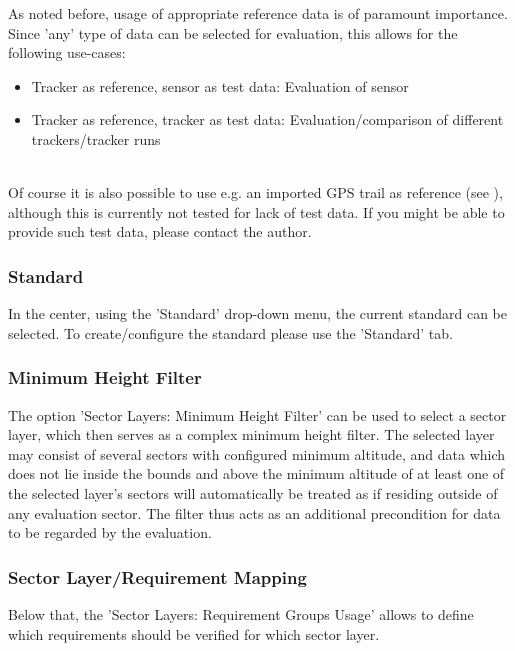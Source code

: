 As noted before, usage of appropriate reference data is of paramount importance. \\

Since 'any' type of data can be selected for evaluation, this allows for the following use-cases:
\begin{itemize}  
\item Tracker as reference, sensor as test data: Evaluation of sensor
\item Tracker as reference, tracker as test data: Evaluation/comparison of different trackers/tracker runs
\end{itemize}
\ \\

Of course it is also possible to use e.g. an imported GPS trail as reference (see ), although this is currently not tested for lack of test data. 
If you might be able to provide such test data, please contact the author. \\

\subsubsection{Standard}
In the center, using the 'Standard' drop-down menu, the current standard can be selected. To create/configure the standard please use the 'Standard' tab.

\subsubsection{Minimum Height Filter}

The option 'Sector Layers: Minimum Height Filter' can be used to select a sector layer, which then serves as a complex minimum height filter.
The selected layer may consist of several sectors with configured minimum altitude, and data which does not lie inside the bounds and above the minimum altitude 
of at least one of the selected layer's sectors will automatically be treated as if residing outside of any evaluation sector. 
The filter thus acts as an additional precondition for data to be regarded by the evaluation.

\subsubsection{Sector Layer/Requirement Mapping}

Below that, the 'Sector Layers: Requirement Groups Usage' allows to define which requirements should be verified for which sector layer. \\

